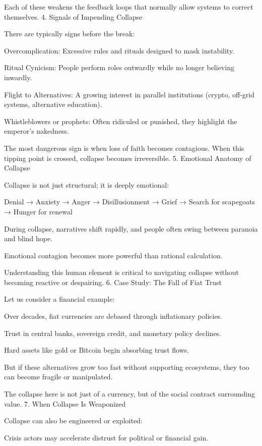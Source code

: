 \documentclass[11pt,oneside]{book}
\begin{document}
Each of these weakens the feedback loops that normally allow systems to correct themselves.
4. Signals of Impending Collapse

There are typically signs before the break:

    Overcomplication: Excessive rules and rituals designed to mask instability.

    Ritual Cynicism: People perform roles outwardly while no longer believing inwardly.

    Flight to Alternatives: A growing interest in parallel institutions (crypto, off-grid systems, alternative education).

    Whistleblowers or prophets: Often ridiculed or punished, they highlight the emperor’s nakedness.

The most dangerous sign is when loss of faith becomes contagious. When this tipping point is crossed, collapse becomes irreversible.
5. Emotional Anatomy of Collapse

Collapse is not just structural; it is deeply emotional:

    Denial → Anxiety → Anger → Disillusionment → Grief → Search for scapegoats → Hunger for renewal

    During collapse, narratives shift rapidly, and people often swing between paranoia and blind hope.

    Emotional contagion becomes more powerful than rational calculation.

Understanding this human element is critical to navigating collapse without becoming reactive or despairing.
6. Case Study: The Fall of Fiat Trust

Let us consider a financial example:

    Over decades, fiat currencies are debased through inflationary policies.

    Trust in central banks, sovereign credit, and monetary policy declines.

    Hard assets like gold or Bitcoin begin absorbing trust flows.

    But if these alternatives grow too fast without supporting ecosystems, they too can become fragile or manipulated.

The collapse here is not just of a currency, but of the social contract surrounding value.
7. When Collapse Is Weaponized

Collapse can also be engineered or exploited:

    Crisis actors may accelerate distrust for political or financial gain.
\end{document}
